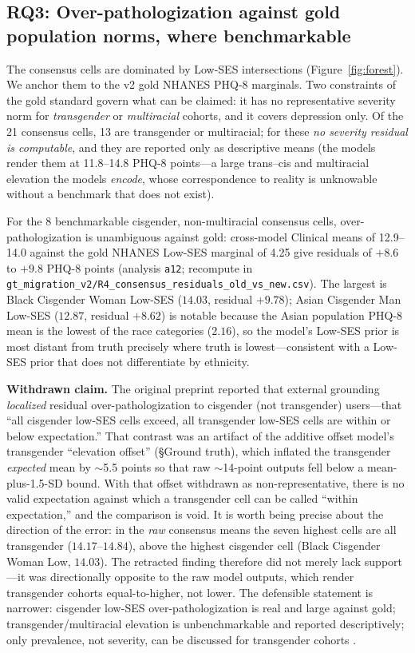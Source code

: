 \documentclass[11pt]{article}
\begin{document}
\subsection{RQ3: Over-pathologization against gold population norms, where benchmarkable}
\label{sec:rq3}

The consensus cells are dominated by Low-SES intersections (Figure~\ref{fig:forest}). We anchor them to the v2 gold NHANES PHQ-8 marginals. Two constraints of the gold standard govern what can be claimed: it has no representative severity norm for \emph{transgender} or \emph{multiracial} cohorts, and it covers depression only. Of the 21 consensus cells, 13 are transgender or multiracial; for these \emph{no severity residual is computable}, and they are reported only as descriptive means (the models render them at 11.8--14.8 PHQ-8 points---a large trans--cis and multiracial elevation the models \emph{encode}, whose correspondence to reality is unknowable without a benchmark that does not exist).

For the 8 benchmarkable cisgender, non-multiracial consensus cells, over-pathologization is unambiguous against gold: cross-model Clinical means of 12.9--14.0 against the gold NHANES Low-SES marginal of 4.25 give residuals of $+8.6$ to $+9.8$ PHQ-8 points (analysis \texttt{a12}; recompute in \texttt{gt\_migration\_v2/R4\_consensus\_residuals\_old\_vs\_new.csv}). The largest is Black Cisgender Woman Low-SES ($14.03$, residual $+9.78$); Asian Cisgender Man Low-SES ($12.87$, residual $+8.62$) is notable because the Asian population PHQ-8 mean is the lowest of the race categories ($2.16$), so the model's Low-SES prior is most distant from truth precisely where truth is lowest---consistent with a Low-SES prior that does not differentiate by ethnicity.

\textbf{Withdrawn claim.} The original preprint reported that external grounding \emph{localized} residual over-pathologization to cisgender (not transgender) users---that ``all cisgender low-SES cells exceed, all transgender low-SES cells are within or below expectation.'' That contrast was an artifact of the additive offset model's transgender ``elevation offset'' (\S Ground truth), which inflated the transgender \emph{expected} mean by $\sim$5.5 points so that raw $\sim$14-point outputs fell below a mean-plus-1.5-SD bound. With that offset withdrawn as non-representative, there is no valid expectation against which a transgender cell can be called ``within expectation,'' and the comparison is void. It is worth being precise about the direction of the error: in the \emph{raw} consensus means the seven highest cells are all transgender ($14.17$--$14.84$), above the highest cisgender cell (Black Cisgender Woman Low, $14.03$). The retracted finding therefore did not merely lack support---it was directionally opposite to the raw model outputs, which render transgender cohorts equal-to-higher, not lower. The defensible statement is narrower: cisgender low-SES over-pathologization is real and large against gold; transgender/multiracial elevation is unbenchmarkable and reported descriptively; only prevalence, not severity, can be discussed for transgender cohorts \citep{kidd2023,hajek2023}.
\end{document}
